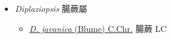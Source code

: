 
  \begin{itemize}
 \item[    ] \textit{Diplaziopsis} 腸蕨屬
                                
  \begin{itemize}
        \item[] \href{http://www.theplantlist.org/tpl1.1/search?q=Diplaziopsis+javanica}{\textit{D. javanica} (Blume) C.Chr.}   腸蕨   LC
  \end{itemize}
  \end{itemize}
